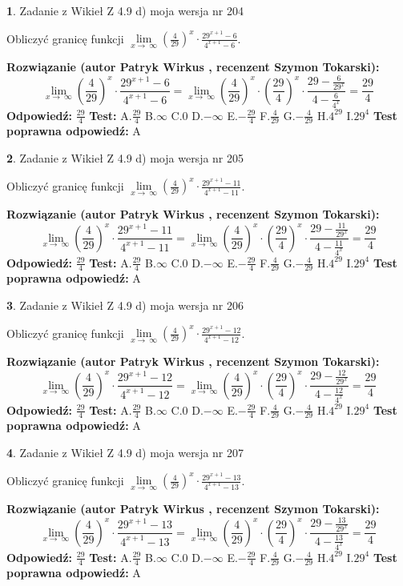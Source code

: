 \documentclass[12pt, a4paper]{article}
\theoremstyle{definition} %
\newtheorem{zad}{}
\newcommand{\zadStart}[1]{\begin{zad}#1\newline}
\newcommand{\zadStop}{\end{zad}}
\newcommand{\rozwStart}[2]{\noindent \textbf{Rozwiązanie (autor #1 , recenzent #2): }\newline}
\newcommand{\rozwStop}{\newline}
\newcommand{\odpStart}{\noindent \textbf{Odpowiedź:}\newline}
\newcommand{\odpStop}{\newline}
\newcommand{\testStart}{\noindent \textbf{Test:}\newline}
\newcommand{\testStop}{\newline}
\newcommand{\kluczStart}{\noindent \textbf{Test poprawna odpowiedź:}\newline}
\newcommand{\kluczStop}{\newline}
\begin{document}
\zadStart{Zadanie z Wikieł Z 4.9 d) moja wersja nr 204}


Obliczyć granicę funkcji  $\lim\limits_{x\to\ \infty}(\frac{4}{29})^{x}\cdot\frac{29^{x+1}-6}{4^{x+1}-6}$.
\zadStop
\rozwStart{Patryk Wirkus}{Szymon Tokarski}
$$\lim\limits_{x\to\ \infty}(\frac{4}{29})^{x}\cdot\frac{29^{x+1}-6}{4^{x+1}-6}=\lim\limits_{x\to\ \infty}(\frac{4}{29})^{x}\cdot(\frac{29}{4})^{x} \cdot \frac{29-\frac{6}{29^{x}}}{4-\frac{6}{4^{x}}} = \frac{29}{4}$$
\rozwStop
\odpStart
$\frac{29}{4}$
\odpStop
\testStart
A.$\frac{29}{4}$ B.$\infty$ C.$0$ D.$-\infty$ E.$-\frac{29}{4}$
F.$\frac{4}{29}$ G.$-\frac{4}{29}$
H.$4^{29}$
I.$29^{4}$
\testStop
\kluczStart
A
\kluczStop



\zadStart{Zadanie z Wikieł Z 4.9 d) moja wersja nr 205}


Obliczyć granicę funkcji  $\lim\limits_{x\to\ \infty}(\frac{4}{29})^{x}\cdot\frac{29^{x+1}-11}{4^{x+1}-11}$.
\zadStop
\rozwStart{Patryk Wirkus}{Szymon Tokarski}
$$\lim\limits_{x\to\ \infty}(\frac{4}{29})^{x}\cdot\frac{29^{x+1}-11}{4^{x+1}-11}=\lim\limits_{x\to\ \infty}(\frac{4}{29})^{x}\cdot(\frac{29}{4})^{x} \cdot \frac{29-\frac{11}{29^{x}}}{4-\frac{11}{4^{x}}} = \frac{29}{4}$$
\rozwStop
\odpStart
$\frac{29}{4}$
\odpStop
\testStart
A.$\frac{29}{4}$ B.$\infty$ C.$0$ D.$-\infty$ E.$-\frac{29}{4}$
F.$\frac{4}{29}$ G.$-\frac{4}{29}$
H.$4^{29}$
I.$29^{4}$
\testStop
\kluczStart
A
\kluczStop



\zadStart{Zadanie z Wikieł Z 4.9 d) moja wersja nr 206}


Obliczyć granicę funkcji  $\lim\limits_{x\to\ \infty}(\frac{4}{29})^{x}\cdot\frac{29^{x+1}-12}{4^{x+1}-12}$.
\zadStop
\rozwStart{Patryk Wirkus}{Szymon Tokarski}
$$\lim\limits_{x\to\ \infty}(\frac{4}{29})^{x}\cdot\frac{29^{x+1}-12}{4^{x+1}-12}=\lim\limits_{x\to\ \infty}(\frac{4}{29})^{x}\cdot(\frac{29}{4})^{x} \cdot \frac{29-\frac{12}{29^{x}}}{4-\frac{12}{4^{x}}} = \frac{29}{4}$$
\rozwStop
\odpStart
$\frac{29}{4}$
\odpStop
\testStart
A.$\frac{29}{4}$ B.$\infty$ C.$0$ D.$-\infty$ E.$-\frac{29}{4}$
F.$\frac{4}{29}$ G.$-\frac{4}{29}$
H.$4^{29}$
I.$29^{4}$
\testStop
\kluczStart
A
\kluczStop



\zadStart{Zadanie z Wikieł Z 4.9 d) moja wersja nr 207}


Obliczyć granicę funkcji  $\lim\limits_{x\to\ \infty}(\frac{4}{29})^{x}\cdot\frac{29^{x+1}-13}{4^{x+1}-13}$.
\zadStop
\rozwStart{Patryk Wirkus}{Szymon Tokarski}
$$\lim\limits_{x\to\ \infty}(\frac{4}{29})^{x}\cdot\frac{29^{x+1}-13}{4^{x+1}-13}=\lim\limits_{x\to\ \infty}(\frac{4}{29})^{x}\cdot(\frac{29}{4})^{x} \cdot \frac{29-\frac{13}{29^{x}}}{4-\frac{13}{4^{x}}} = \frac{29}{4}$$
\rozwStop
\odpStart
$\frac{29}{4}$
\odpStop
\testStart
A.$\frac{29}{4}$ B.$\infty$ C.$0$ D.$-\infty$ E.$-\frac{29}{4}$
F.$\frac{4}{29}$ G.$-\frac{4}{29}$
H.$4^{29}$
I.$29^{4}$
\testStop
\kluczStart
A
\kluczStop
\end{document}
